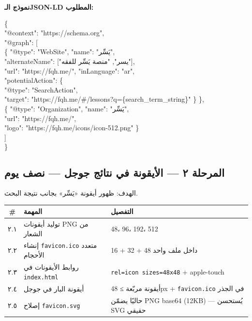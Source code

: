 \documentclass[11pt]{article}
\newcommand{\code}[1]{\textcolor{darkbg}{\texttt{\small #1}}}
\begin{document}
\begin{infobox}
\textbf{نموذج الـJSON-LD المطلوب:}
\begin{center}
\begin{tcolorbox}[colback=codebg, colframe=codebg, coltext=white, arc=3pt, left=10pt, right=10pt, width=\linewidth]
\ttfamily\footnotesize\raggedleft
\{\\
\hspace*{1em}"@context": "https://schema.org",\\
\hspace*{1em}"@graph": [\\
\hspace*{2em}\{ "@type": "WebSite", "name": "يَسِّر",\\
\hspace*{3em}"alternateName": ["يسر", "منصة يَسِّر للفقه"],\\
\hspace*{3em}"url": "https://fqh.me/", "inLanguage": "ar",\\
\hspace*{3em}"potentialAction": \{\\
\hspace*{4em}"@type": "SearchAction",\\
\hspace*{4em}"target": "https://fqh.me/\#/lessons?q=\{search\_term\_string\}" \} \},\\
\hspace*{2em}\{ "@type": "Organization", "name": "يَسِّر",\\
\hspace*{3em}"url": "https://fqh.me/",\\
\hspace*{3em}"logo": "https://fqh.me/icons/icon-512.png" \}\\
\hspace*{1em}]\\
\}
\end{tcolorbox}
\end{center}
\end{infobox}

\subsection{المرحلة ٢ — الأيقونة في نتائج جوجل — نصف يوم}
الهدف: ظهور أيقونة «يَسِّر» بجانب نتيجة البحث.

\begin{tabular}{@{}c p{6.5cm} p{5cm}@{}}
\toprule
\textbf{\#} & \textbf{المهمة} & \textbf{التفصيل} \\
\midrule
٢.١ & توليد أيقونات PNG من الشعار & 48، 96، 192، 512 \\
٢.٢ & إنشاء \code{favicon.ico} متعدد الأحجام & 16 + 32 + 48 داخل ملف واحد \\
٢.٣ & روابط الأيقونات في \code{index.html} & \code{rel=icon sizes=48x48} + apple-touch \\
٢.٤ & أيقونة البار في جوجل & أيقونة مربّعة ≥ 48px + \code{favicon.ico} في الجذر \\
٢.٥ & إصلاح \code{favicon.svg} & حاليًا يضمّن PNG base64 (12KB) — يُستحسن SVG حقيقي \\
\bottomrule
\end{tabular}
\end{document}
